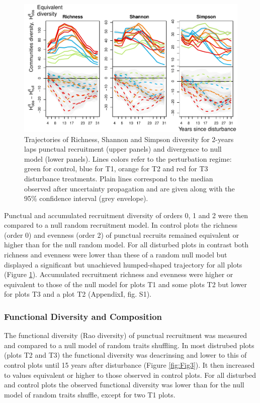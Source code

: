 \documentclass[fleqn,10pt]{ArtEcoFoG} %
\begin{document}
\begin{figure}

{\centering \includegraphics[width=0.8\linewidth]{RecruitmentTrajectories_files/figure-latex/Fig1-1} 

}

\caption{Trajectories of Richness, Shannon and Simpson diversity for 2-years laps punctual  recruitment (upper panels) and divergence to null model (lower panels). Lines colors refer to the perturbation regime: green for control, blue for T1, orange for T2 and red for T3 disturbance treatments. Plain lines correspond to the median observed after uncertainty propagation and are given along with the 95\% confidence interval (grey envelope).}\label{fig:Fig1}
\end{figure}

Punctual and accumulated recruitment diversity of orders 0, 1 and 2 were
then compared to a null random recruitment model. In control plots the
richness (order 0) and evenness (order 2) of punctual recruits remained
equivalent or higher than for the null random model. For all disturbed
plots in contrast both richness and evenness were lower than these of a
random null model but displayed a significant but unachieved
humped-shaped trajectory for all plots (Figure \ref{fig:Fig1}).
Accumulated recruitment richness and evenness were higher or equivalent
to those of the null model for plots T1 and some plots T2 but lower for
plots T3 and a plot T2 (AppendixI, fig. S1).

\subsubsection{Functional Diversity and
Composition}\label{functional-diversity-and-composition}

The functional diversity (Rao diversity) of punctual recruitment was
measured and compared to a null model of random traits shuffling. In
most distrubed plots (plots T2 and T3) the functional diversity was
deacrinsing and lower to this of control plots until 15 years after
disturbance (Figure \ref{fig:Fig3}). It then increased to values
equivalent or higher to those observed in control plots. For all
disturbed and control plots the observed functional diversity was lower
than for the null model of random traits shuffle, except for two T1
plots.
\end{document}
